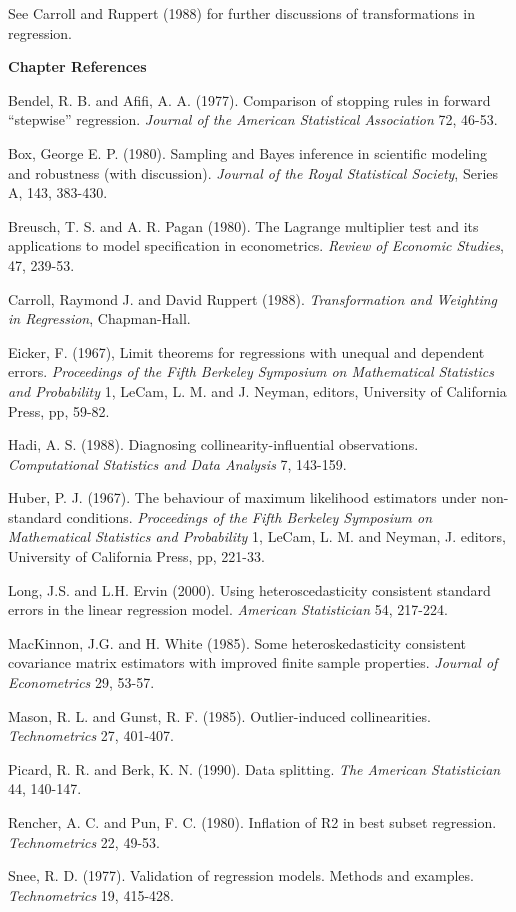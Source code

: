 See Carroll and Ruppert (1988) for further discussions of
transformations in regression.

\bigskip

\textbf{Chapter References}
\begin{multicols}{2}

Bendel, R. B. and Afifi, A. A. (1977). Comparison of stopping rules
in forward ``stepwise'' regression. \textit{Journal of the American
Statistical Association} 72, 46-53.

Box, George E. P. (1980). Sampling and Bayes inference in scientific
modeling and robustness (with discussion). \textit{Journal of the
Royal Statistical Society}, Series A, 143, 383-430.

Breusch, T. S. and A. R. Pagan (1980).  The Lagrange multiplier test
and its applications to model specification in econometrics.
\textit{Review of Economic Studies}, 47, 239-53.

Carroll, Raymond J. and David Ruppert (1988). \textit{Transformation
and Weighting in Regression}, Chapman-Hall.

Eicker, F. (1967), Limit theorems for regressions with unequal and
dependent errors.  \textit{Proceedings of the Fifth Berkeley
Symposium on Mathematical Statistics and Probability} 1, LeCam, L.
M. and J. Neyman, editors, University of California Press, pp,
59-82.

Hadi, A. S. (1988). Diagnosing collinearity-influential
observations. \textit{Computational Statistics and Data Analysis} 7,
143-159.

Huber, P. J. (1967). The behaviour of maximum likelihood estimators
under non-standard conditions. \textit{Proceedings of the Fifth
Berkeley Symposium on Mathematical Statistics and Probability} 1,
LeCam, L. M. and Neyman, J. editors, University of California Press,
pp, 221-33.

Long, J.S. and L.H. Ervin (2000). Using heteroscedasticity
consistent standard errors in the linear regression model.
\textit{American Statistician} 54, 217-224.

MacKinnon, J.G. and H. White (1985). Some heteroskedasticity
consistent covariance matrix estimators with improved finite sample
properties. \textit{Journal of Econometrics} 29, 53-57.

Mason, R. L. and Gunst, R. F. (1985). Outlier-induced
collinearities. \textit{Technometrics} 27, 401-407.

Picard, R. R. and Berk, K. N. (1990). Data splitting. \textit{The
American Statistician} 44, 140-147.

Rencher, A. C. and Pun, F. C. (1980). Inflation of R2 in best subset
regression. \textit{Technometrics} 22, 49-53.

Snee, R. D. (1977). Validation of regression models. Methods and
examples. \textit{Technometrics} 19, 415-428.


\end{multicols}


